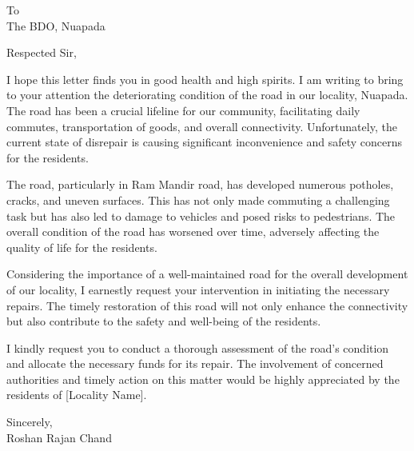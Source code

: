 \documentclass[a4paper,12pt]{letter}
\begin{document}
\begin{letter}{}
To\\The BDO, Nuapada


\opening{Respected Sir,}

I hope this letter finds you in good health and high spirits. I am writing to bring to your attention the deteriorating condition of the road in our locality, Nuapada. The road has been a crucial lifeline for our community, facilitating daily commutes, transportation of goods, and overall connectivity. Unfortunately, the current state of disrepair is causing significant inconvenience and safety concerns for the residents.

The road, particularly in Ram Mandir road, has developed numerous potholes, cracks, and uneven surfaces. This has not only made commuting a challenging task but has also led to damage to vehicles and posed risks to pedestrians. The overall condition of the road has worsened over time, adversely affecting the quality of life for the residents.

Considering the importance of a well-maintained road for the overall development of our locality, I earnestly request your intervention in initiating the necessary repairs. The timely restoration of this road will not only enhance the connectivity but also contribute to the safety and well-being of the residents.

I kindly request you to conduct a thorough assessment of the road's condition and allocate the necessary funds for its repair. The involvement of concerned authorities and timely action on this matter would be highly appreciated by the residents of [Locality Name].

\closing{Sincerely,\\Roshan Rajan Chand}

\end{letter}
\end{document}
